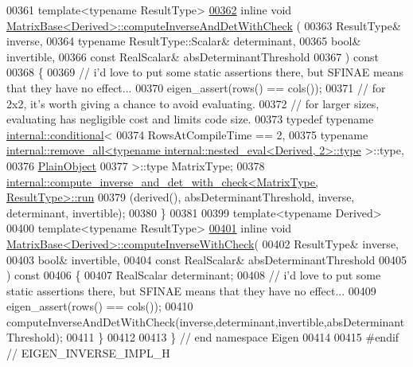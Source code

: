 \begin{DoxyCode}
00361 \textcolor{keyword}{template}<\textcolor{keyword}{typename} ResultType>
\hyperlink{group___core___module_a7baaf2fdec0191a2166cf9fd84a2dcb2}{00362} \textcolor{keyword}{inline} \textcolor{keywordtype}{void} \hyperlink{group___core___module_a7baaf2fdec0191a2166cf9fd84a2dcb2}{MatrixBase<Derived>::computeInverseAndDetWithCheck}
      (
00363     ResultType& inverse,
00364     \textcolor{keyword}{typename} ResultType::Scalar& determinant,
00365     \textcolor{keywordtype}{bool}& invertible,
00366     \textcolor{keyword}{const} RealScalar& absDeterminantThreshold
00367   )\textcolor{keyword}{ const}
00368 \textcolor{keyword}{}\{
00369   \textcolor{comment}{// i'd love to put some static assertions there, but SFINAE means that they have no effect...}
00370   eigen\_assert(rows() == cols());
00371   \textcolor{comment}{// for 2x2, it's worth giving a chance to avoid evaluating.}
00372   \textcolor{comment}{// for larger sizes, evaluating has negligible cost and limits code size.}
00373   \textcolor{keyword}{typedef} \textcolor{keyword}{typename} \hyperlink{struct_eigen_1_1internal_1_1conditional}{internal::conditional}<
00374     RowsAtCompileTime == 2,
00375     \textcolor{keyword}{typename} 
      \hyperlink{struct_eigen_1_1internal_1_1remove__all}{internal::remove\_all<typename internal::nested\_eval<Derived, 2>::type}
      >::type,
00376     \hyperlink{class_eigen_1_1internal_1_1_tensor_lazy_evaluator_writable}{PlainObject}
00377   >::type MatrixType;
00378   \hyperlink{struct_eigen_1_1internal_1_1compute__inverse__and__det__with__check}{internal::compute\_inverse\_and\_det\_with\_check<MatrixType, ResultType>::run}
00379     (derived(), absDeterminantThreshold, inverse, determinant, invertible);
00380 \}
00381 
00399 \textcolor{keyword}{template}<\textcolor{keyword}{typename} Derived>
00400 \textcolor{keyword}{template}<\textcolor{keyword}{typename} ResultType>
\hyperlink{group___core___module_a116f3b50d2af7dbdf7473e517a5b8b0f}{00401} \textcolor{keyword}{inline} \textcolor{keywordtype}{void} \hyperlink{group___core___module_a116f3b50d2af7dbdf7473e517a5b8b0f}{MatrixBase<Derived>::computeInverseWithCheck}(
00402     ResultType& inverse,
00403     \textcolor{keywordtype}{bool}& invertible,
00404     \textcolor{keyword}{const} RealScalar& absDeterminantThreshold
00405   )\textcolor{keyword}{ const}
00406 \textcolor{keyword}{}\{
00407   RealScalar determinant;
00408   \textcolor{comment}{// i'd love to put some static assertions there, but SFINAE means that they have no effect...}
00409   eigen\_assert(rows() == cols());
00410   computeInverseAndDetWithCheck(inverse,determinant,invertible,absDeterminantThreshold);
00411 \}
00412 
00413 \} \textcolor{comment}{// end namespace Eigen}
00414 
00415 \textcolor{preprocessor}{#endif // EIGEN\_INVERSE\_IMPL\_H}
\end{DoxyCode}
